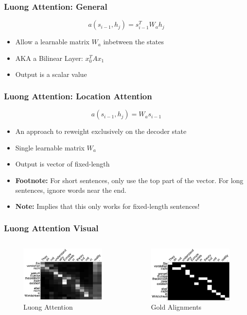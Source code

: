 \documentclass[usenames,dvipsnames]{beamer}
\begin{document}
\begin{frame}
\frametitle{Luong Attention: General}
\begin{equation*}
  a\left( s_{i-1}, h_j \right) = s_{i-1}^T W_a h_j
\end{equation*}
\begin{itemize}
  \item Allow a learnable matrix $W_a$ inbetween the states
  \item AKA a Bilinear Layer: $x_0^T A x_1$
  \item Output is a scalar value
\end{itemize}
\end{frame}

\begin{frame}
\frametitle{Luong Attention: Location Attention}
\begin{equation*}
  a\left( s_{i-1}, h_j \right) = W_a s_{i-1}
\end{equation*}
\begin{itemize}
  \item An approach to reweight exclusively on the decoder state
  \item Single learnable matrix $W_a$
  \item Output is vector of fixed-length
  \item \textbf{Footnote:} For short sentences, only use the top part of the vector. For long sentences, ignore words near the end.
  \item \textbf{Note:} Implies that this only works for fixed-length sentences!
\end{itemize}
\end{frame}


\begin{frame}
  \frametitle{Luong Attention Visual}
  \begin{columns}
  \begin{column}{0.45\textwidth}
  \begin{figure}
    \includegraphics[width=5cm]{assets/global}
    \caption{Luong Attention}
  \end{figure}
\end{column}
\begin{column}{0.45\textwidth}
  \begin{figure}
    \includegraphics[width=5cm]{assets/gold}
    \caption{Gold Alignments}
  \end{figure}
\end{column}
  \end{columns}
\end{frame}
\end{document}
